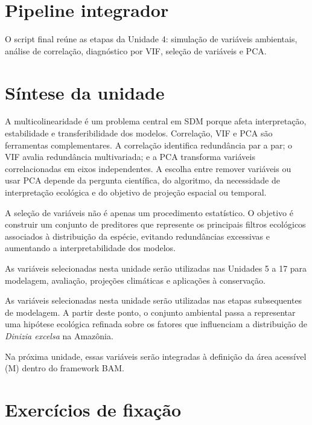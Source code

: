 \documentclass{ueap-sdm}
\begin{document}
\section{Pipeline integrador}

O script final reúne as etapas da Unidade 4: simulação de variáveis ambientais, análise de correlação, diagnóstico por VIF, seleção de variáveis e PCA.


\section{Síntese da unidade}

A multicolinearidade é um problema central em SDM porque afeta interpretação, estabilidade e transferibilidade dos modelos. Correlação, VIF e PCA são ferramentas complementares. A correlação identifica redundância par a par; o VIF avalia redundância multivariada; e a PCA transforma variáveis correlacionadas em eixos independentes. A escolha entre remover variáveis ou usar PCA depende da pergunta científica, do algoritmo, da necessidade de interpretação ecológica e do objetivo de projeção espacial ou temporal.

\begin{conceito}[title={\faBook\quad Mensagem central da Unidade 4}]
	A seleção de variáveis não é apenas um procedimento estatístico.
	O objetivo é construir um conjunto de preditores que represente
	os principais filtros ecológicos associados à distribuição da espécie,
	evitando redundâncias excessivas e aumentando a interpretabilidade
	dos modelos.
	
	As variáveis selecionadas nesta unidade serão utilizadas
	nas Unidades 5 a 17 para modelagem, avaliação,
	projeções climáticas e aplicações à conservação.
\end{conceito}

\begin{aplicacao}
	As variáveis selecionadas nesta unidade serão utilizadas nas etapas subsequentes de modelagem. A partir deste ponto, o conjunto ambiental passa a representar uma hipótese ecológica refinada sobre os fatores que influenciam a distribuição de \textit{Dinizia excelsa} na Amazônia.
	
	Na próxima unidade, essas variáveis serão integradas à definição da área acessível (M) dentro do framework BAM.
\end{aplicacao}

\section{Exercícios de fixação}
\end{document}
